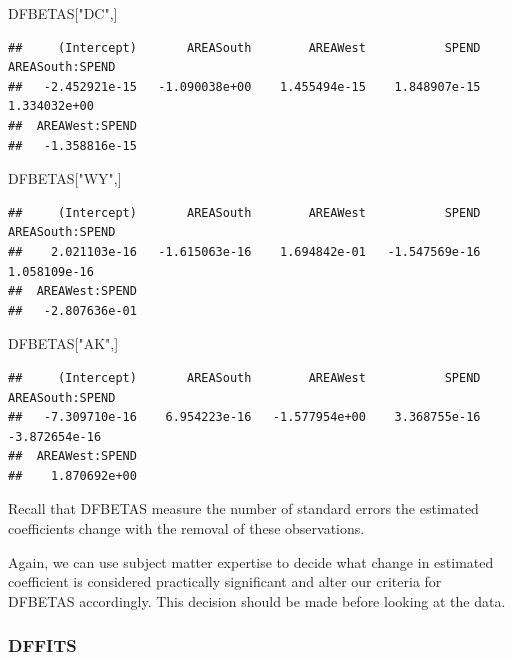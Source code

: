 \documentclass[
]{book}
\newenvironment{Shaded}{\begin{snugshade}}{\end{snugshade}}
\newcommand{\NormalTok}[1]{#1}
\newcommand{\StringTok}[1]{\textcolor[rgb]{0.31,0.60,0.02}{#1}}
\begin{document}
\begin{Shaded}
\begin{Highlighting}[]
\NormalTok{DFBETAS[}\StringTok{"DC"}\NormalTok{,]}
\end{Highlighting}
\end{Shaded}

\begin{verbatim}
##     (Intercept)       AREASouth        AREAWest           SPEND AREASouth:SPEND 
##   -2.452921e-15   -1.090038e+00    1.455494e-15    1.848907e-15    1.334032e+00 
##  AREAWest:SPEND 
##   -1.358816e-15
\end{verbatim}

\begin{Shaded}
\begin{Highlighting}[]
\NormalTok{DFBETAS[}\StringTok{"WY"}\NormalTok{,]}
\end{Highlighting}
\end{Shaded}

\begin{verbatim}
##     (Intercept)       AREASouth        AREAWest           SPEND AREASouth:SPEND 
##    2.021103e-16   -1.615063e-16    1.694842e-01   -1.547569e-16    1.058109e-16 
##  AREAWest:SPEND 
##   -2.807636e-01
\end{verbatim}

\begin{Shaded}
\begin{Highlighting}[]
\NormalTok{DFBETAS[}\StringTok{"AK"}\NormalTok{,]}
\end{Highlighting}
\end{Shaded}

\begin{verbatim}
##     (Intercept)       AREASouth        AREAWest           SPEND AREASouth:SPEND 
##   -7.309710e-16    6.954223e-16   -1.577954e+00    3.368755e-16   -3.872654e-16 
##  AREAWest:SPEND 
##    1.870692e+00
\end{verbatim}

Recall that DFBETAS measure the number of standard errors the estimated coefficients change with the removal of these observations.

Again, we can use subject matter expertise to decide what change in estimated coefficient is considered practically significant and alter our criteria for DFBETAS accordingly. This decision should be made before looking at the data.

\hypertarget{dffits-1}{%
\subsubsection*{DFFITS}\label{dffits-1}}
\end{document}
